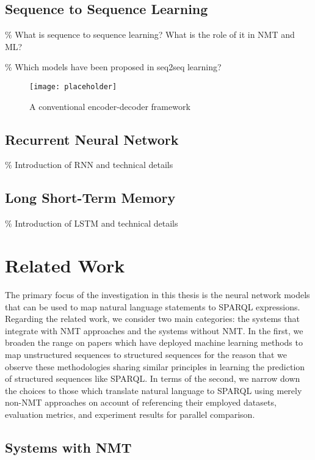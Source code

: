 \subsection{Sequence to Sequence Learning}
\% What is sequence to sequence learning? What is the role of it in NMT and ML?

\% Which models have been proposed in seq2seq learning?

\begin{figure}[h]
\texttt{[image: placeholder]}
\centering
\caption{A conventional encoder-decoder framework}
\label{figure:encoder-decoder}
\end{figure}

\subsection{Recurrent Neural Network} \label{subsection:rnn}
\% Introduction of RNN and technical details

\subsection{Long Short-Term Memory}
\% Introduction of LSTM and technical details

\section{Related Work} \label{section:related work}

The primary focus of the investigation in this thesis is the neural network models that can be used to map natural language statements to SPARQL expressions. Regarding the related work, we consider two main categories: the systems that integrate with NMT approaches and the systems without NMT. In the first, we broaden the range on papers which have deployed machine learning methods to map unstructured sequences to structured sequences for the reason that we observe these methodologies sharing similar principles in learning the prediction of structured sequences like SPARQL. In terms of the second, we narrow down the choices to those which translate natural language to SPARQL using merely non-NMT approaches on account of referencing their employed datasets, evaluation metrics, and experiment results for parallel comparison. 

\subsection{Systems with NMT} \label{subsection:related work with nmt}

